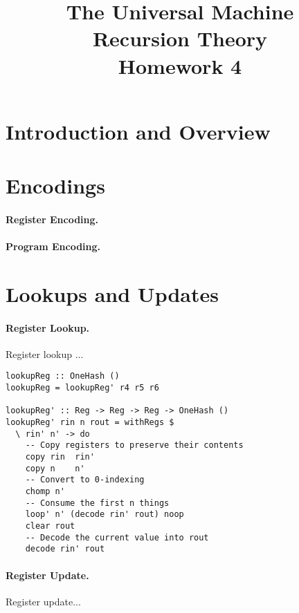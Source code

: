 \documentclass[10pt, preprint, nocopyrightspace]{sigplanconf}
\title{The Universal \oh Machine\\\large Recursion Theory\\ Homework 4}
\begin{document}
 

\maketitle

\section{Introduction and Overview}

\section{Encodings}

\paragraph{Register Encoding.}

\paragraph{Program Encoding.}

\section{Lookups and Updates}

\paragraph{Register Lookup.}

Register lookup ...

\begin{lstlisting}
lookupReg :: OneHash ()
lookupReg = lookupReg' r4 r5 r6

lookupReg' :: Reg -> Reg -> Reg -> OneHash ()
lookupReg' rin n rout = withRegs $ 
  \ rin' n' -> do
    -- Copy registers to preserve their contents
    copy rin  rin'
    copy n    n'
    -- Convert to 0-indexing
    chomp n'
    -- Consume the first n things
    loop' n' (decode rin' rout) noop
    clear rout
    -- Decode the current value into rout
    decode rin' rout
\end{lstlisting}

\paragraph{Register Update.}

Register update...
\end{document}
